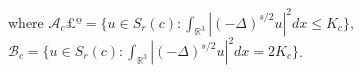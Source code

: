 where $\mathcal{A}_c£º=\{u\in  S_{r}(c):\int_{\mathbb{R}^3}|
(-\Delta)^{s/2}u|^2dx\leq K_c\}$, 
$\mathcal{B}_c=\{u\in S_{r}(c):\int_{\mathbb{R}^3}|(-\Delta)^{s/2}u|^2dx=2 K_c\}$.
